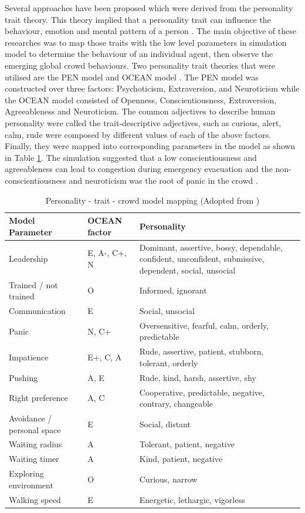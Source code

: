 Several approaches have been proposed which were derived from the personality trait theory. This theory implied that a personality trait can influence the behaviour, emotion and mental pattern of a person \citep{Durupinar2008}. The main objective of these researches was to map those traits with the low level parameters in simulation model to determine the behaviour of an individual agent, then observe the emerging global crowd behaviours. Two personality trait theories that were utilised are the PEN model \citep{Guy2011} and OCEAN model \citep{Durupinar2008,Durupinar2011}. The PEN model was constructed over three factors: Psychoticism, Extraversion, and Neuroticism while the OCEAN model consisted of Openness, Conscientiousness, Extroversion, Agreeableness and Neuroticism. The common adjectives to describe human personality were called the trait-descriptive adjectives, such as curious, alert, calm, rude were composed by different values of each of the above factors. Finally, they were mapped into corresponding parameters in the model as shown in Table \ref{table:oceanPersonality}. The simulation suggested that a low conscientiousness and agreeableness can lead to congestion during emergency evacuation and the non-conscientiousness and neuroticism was the root of panic in the crowd \citep{Durupinar2008}.

\begin{table}[!htbp]
	\caption{Personality - trait - crowd model mapping (Adopted from \citet{Durupinar2008})}
	\label{table:oceanPersonality}
	\centering
	\begin{tabular}{|l|l|p{6.5cm}|}
		\hline
		\textbf{Model Parameter} & \textbf{OCEAN factor} & \textbf{Personality} \\ \hline \hline
		Leadership & E, A-, C+, N & Dominant, assertive, bossy, dependable, confident, unconfident, submissive, dependent, social, unsocial \\ \hline
		Trained / not trained & O & Informed, ignorant \\ \hline
		Communication & E & Social, unsocial \\ \hline
		Panic & N, C+ & Oversensitive, fearful, calm, orderly, predictable \\ \hline
		Impatience & E+, C, A & Rude, assertive, patient, stubborn, tolerant, orderly \\ \hline
		Pushing & A, E & Rude, kind, harsh, assertive, shy \\ \hline
		Right preference & A, C & Cooperative, predictable, negative, contrary, changeable \\ \hline
		Avoidance / personal space & E & Social, distant \\ \hline
		Waiting radius & A & Tolerant, patient, negative \\ \hline
		Waiting timer & A & Kind, patient, negative \\ \hline
		Exploring environment & O & Curious, narrow \\ \hline
		Walking speed & E & Energetic, lethargic, vigorless \\ \hline
	\end{tabular}
\end{table}

